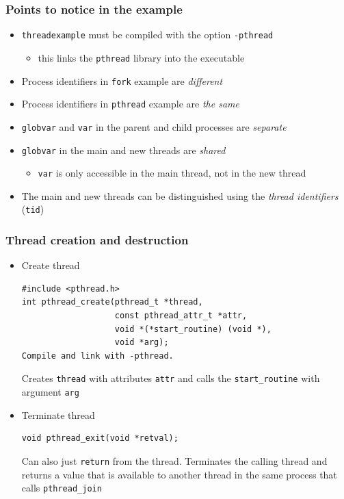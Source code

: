 \documentclass[hyperref={pdfpagelabels=false},svgnames]{beamer}
\begin{document}
\begin{frame}
  \frametitle{Points to notice in the example}
  \begin{itemize}
    \item \texttt{threadexample} must be compiled with
      the option \texttt{-pthread}
      \begin{itemize}
        \item this links the \texttt{pthread} library into
          the executable
      \end{itemize}
    \item Process identifiers in \texttt{fork} example are
      \emph{different}
    \item Process identifiers in \texttt{pthread} example
      are \emph{the same}
    \item \texttt{globvar} and \texttt{var} in the parent and child
      processes are \emph{separate}
    \item \texttt{globvar} in the main and new threads are \emph{shared}
      \begin{itemize}
        \item \texttt{var} is only accessible in the main thread, not in 
          the new thread
      \end{itemize}
    \item The main and new threads can be distinguished using the
      \emph{thread identifiers} (\texttt{tid})
  \end{itemize}
\end{frame}

\begin{frame}[fragile, shrink=10]
  \frametitle{Thread creation and destruction}
  \begin{itemize}
    \item Create thread
      \begin{verbatim}
#include <pthread.h>
int pthread_create(pthread_t *thread, 
                   const pthread_attr_t *attr,
                   void *(*start_routine) (void *), 
                   void *arg);
Compile and link with -pthread.
      \end{verbatim}
      Creates \verb'thread' with attributes \verb'attr' and
      calls the \verb'start_routine' with argument \verb'arg'
    \item Terminate thread
      \begin{verbatim}
void pthread_exit(void *retval);
      \end{verbatim}
      Can also just \verb'return' from the thread. Terminates the calling
      thread and returns a value that is available to another thread in the same process that
      calls \verb'pthread_join'
  \end{itemize}
\end{frame}
\end{document}
